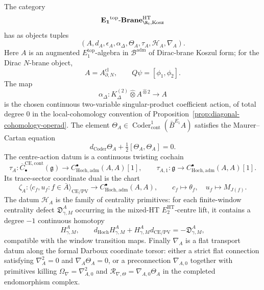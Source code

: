 \begin{defn}
\label{defn:decorated-brane-boundary-data-categories}
The category
\[
  \mathbf{E_1}^{\mathrm{top}}\text{-}
  \mathbf{Brane}^{\mathrm{HT}}_{\R_t,\mathrm{Kosz}}
\]
has as objects tuples
\[
  (A,d_A,\epsilon_A,\alpha_\Delta,\Theta_A,\tau_A,
    \mathcal H_A,\nabla_A).
\]
Here \(A\) is an augmented \(E_1^{\mathrm{top}}\)-algebra in
\(\mathcal B^{\mathrm{adm}}\) of Dirac-brane Koszul form; for the
Dirac \(N\)-brane object,
\[
  A=A^{\mathrm{cl}}_{\partial,N},\qquad Q\psi=[\phi_1,\phi_2].
\]
The map
\[
  \alpha_\Delta\colon
  K^{(2)}_\Delta\widehat\otimes A^{\widehat\otimes2}\longrightarrow A
\]
is the chosen continuous two-variable singular-product coefficient
action, of total degree \(0\) in the local-cohomology convention of
Proposition~\ref{prop:diagonal-cohomology-operad}.  The element
\(\Theta_A\in\operatorname{Coder}^1_{\mathrm{cont}}(\bar B^{E_1}A)\)
satisfies the Maurer--Cartan equation
\[
  d_{\operatorname{Coder}}\Theta_A+\tfrac12[\Theta_A,\Theta_A]=0.
\]
The centre-action datum is a continuous twisting cochain
\[
  \tau_A\colon
  \overline C^{\mathrm{CE},\mathrm{cont}}_\bullet(\mathfrak g)
  \longrightarrow C^\bullet_{\mathrm{Hoch},\mathrm{adm}}(A,A)[1],
  \qquad
  \tau_{A,1}\colon\mathfrak g\longrightarrow
  C^\bullet_{\mathrm{Hoch},\mathrm{adm}}(A,A)[1].
\]
Its trace-sector coordinate dual is the chart
\[
  \zeta_A\colon
  \langle c_f,u_f:f\in\bar A\rangle_{\mathrm{CE/PV}}
  \longrightarrow C^\bullet_{\mathrm{Hoch},\mathrm{adm}}(A,A),
  \qquad
  c_f\mapsto\theta_f,\quad u_f\mapsto M_{J(f)}.
\]
The datum \(\mathcal H_A\) is the family of centrality primitives:
for each finite-window centrality defect
\(\mathfrak D_{\gamma,M}^A\) occurring in the mixed-HT
\(E_2^{\mathrm{HT}}\)-centre
lift, it contains a degree \(-1\) continuous homotopy
\[
  H_{\gamma,M}^A,\qquad
  d_{\mathrm{Hoch}}H_{\gamma,M}^A
  +H_{\gamma,M}^A d_{\mathrm{CE/PV}}
  =-\mathfrak D_{\gamma,M}^A,
\]
compatible with the window transition maps.  Finally
\(\nabla_A\) is a flat transport datum along the formal Darboux
coordinate torsor: either a strict flat connection satisfying
\(\nabla_A^2=0\) and \(\nabla_A\Theta_A=0\), or a preconnection
\(\nabla_{A,0}\) together with primitives killing
\(\Omega_{\nabla}=\nabla_{A,0}^2\) and
\(\mathcal R_{\nabla,\Theta}=\nabla_{A,0}\Theta_A\) in the completed
endomorphism complex.


\end{defn}
